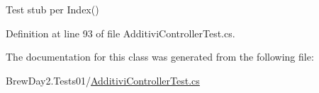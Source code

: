 Test stub per Index()



Definition at line 93 of file Additivi\+Controller\+Test.\+cs.



The documentation for this class was generated from the following file\+:\begin{DoxyCompactItemize}
\item 
Brew\+Day2.\+Tests01/\mbox{\hyperlink{1_2_additivi_controller_test_8cs}{Additivi\+Controller\+Test.\+cs}}\end{DoxyCompactItemize}

